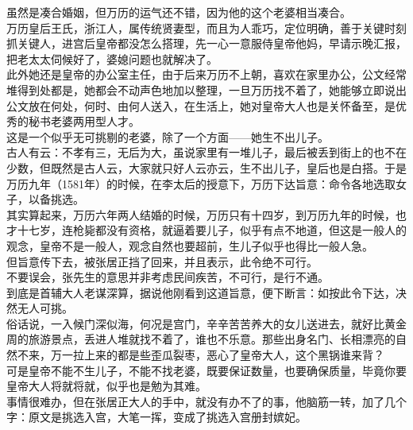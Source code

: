 \begin{multicols}{\theparacolNo}
虽然是凑合婚姻，但万历的运气还不错，因为他的这个老婆相当凑合。\\

万历皇后王氏，浙江人，属传统贤妻型，而且为人乖巧，定位明确，善于关键时刻抓关键人，进宫后皇帝都没怎么搭理，先一心一意服侍皇帝他妈，早请示晚汇报，把老太太伺候好了，婆媳问题也就解决了。\\

此外她还是皇帝的办公室主任，由于后来万历不上朝，喜欢在家里办公，公文经常堆得到处都是，她都会不动声色地加以整理，一旦万历找不着了，她能够立即说出公文放在何处，何时、由何人送入，在生活上，她对皇帝大人也是关怀备至，是优秀的秘书老婆两用型人才。\\

这是一个似乎无可挑剔的老婆，除了一个方面——她生不出儿子。\\

古人有云：不孝有三，无后为大，虽说家里有一堆儿子，最后被丢到街上的也不在少数，但既然是古人云，大家就只好人云亦云，生不出儿子，皇后也是白搭。于是万历九年（1581年）的时候，在李太后的授意下，万历下达旨意：命令各地选取女子，以备挑选。\\

其实算起来，万历六年两人结婚的时候，万历只有十四岁，到万历九年的时候，也才十七岁，连枪毙都没有资格，就逼着要儿子，似乎有点不地道，但这是一般人的观念，皇帝不是一般人，观念自然也要超前，生儿子似乎也得比一般人急。\\

但旨意传下去，被张居正挡了回来，并且表示，此令绝不可行。\\

不要误会，张先生的意思并非考虑民间疾苦，不可行，是行不通。\\

到底是首辅大人老谋深算，据说他刚看到这道旨意，便下断言：如按此令下达，决然无人可挑。\\

俗话说，一入候门深似海，何况是宫门，辛辛苦苦养大的女儿送进去，就好比黄金周的旅游景点，丢进人堆就找不着了，谁也不乐意。那些出身名门、长相漂亮的自然不来，万一拉上来的都是些歪瓜裂枣，恶心了皇帝大人，这个黑锅谁来背？\\

可是皇帝不能不生儿子，不能不找老婆，既要保证数量，也要确保质量，毕竟你要皇帝大人将就将就，似乎也是勉为其难。\\

事情很难办，但在张居正大人的手中，就没有办不了的事，他脑筋一转，加了几个字：原文是挑选入宫，大笔一挥，变成了挑选入宫册封嫔妃。\\


\end{multicols}

